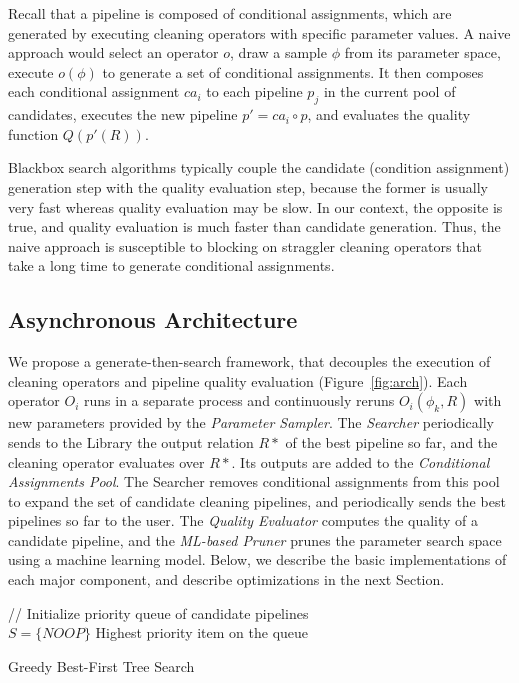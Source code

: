Recall that a pipeline is composed of conditional assignments, which are generated by executing cleaning operators with specific parameter values.   A naive approach would select an operator $o$, draw a sample $\phi$ from its parameter space, execute $o(\phi)$ to generate a set of conditional assignments.      It then composes each conditional assignment $ca_i$ to each pipeline $p_j$ in the current pool of candidates, executes the new pipeline $p' = ca_i \circ p$, and evaluates the quality function $Q(p'(R))$.

Blackbox search algorithms typically couple the candidate (condition assignment) generation step with the quality evaluation step, because the former is usually very fast whereas quality evaluation may be slow.  In our context, the opposite is true, and quality evaluation is much faster than candidate generation.   Thus, the naive approach is susceptible to blocking on straggler cleaning operators that take a long time to generate conditional assignments. 

\subsection{Asynchronous Architecture}

We propose a generate-then-search framework, that decouples the execution of cleaning operators and pipeline quality evaluation (Figure~\ref{fig:arch}).  Each operator $O_i$ runs in a separate process and continuously reruns $O_i(\phi_k, R)$ with new parameters provided by the {\it Parameter Sampler}.  The {\it Searcher} periodically sends to the Library the output relation $R*$ of the best pipeline so far, and the cleaning operator evaluates over $R*$.  Its outputs are added to the {\it Conditional Assignments Pool}.  The Searcher removes conditional assignments from this pool to expand the set of candidate cleaning pipelines, and periodically sends the best pipelines so far to the user.   The {\it Quality Evaluator} computes the quality of a candidate pipeline, and the {\it ML-based Pruner} prunes the parameter search space using a machine learning model.  Below, we describe the basic implementations of each major component, and describe optimizations in the next Section.


{
\begin{algorithm}[t]
// Initialize priority queue of candidate pipelines\\
$S = \{NOOP\}$
\Return Highest priority item on the queue
\caption{Greedy Best-First Tree Search}
\label{alg:main}
\end{algorithm}
}

